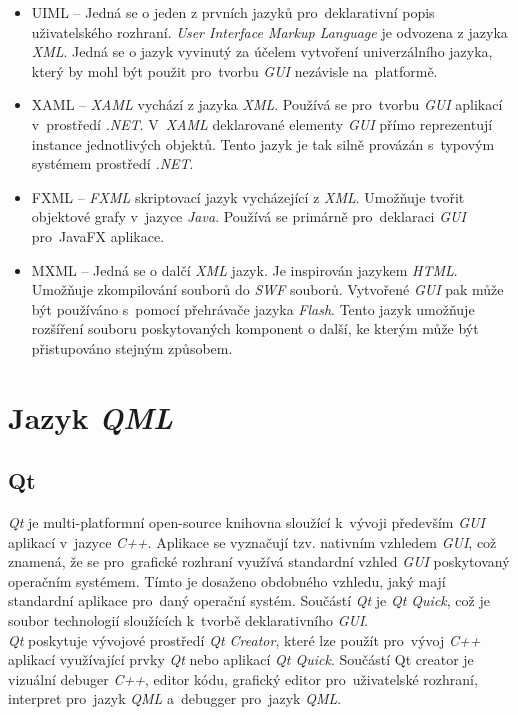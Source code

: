 \documentclass[11pt,twoside,a4paper]{book}
\begin{document}
\begin{itemize}
\item UIML – Jedná se o jeden z prvních jazyků pro~deklarativní popis uživatelského rozhraní. \textit{User Interface Markup Language} je odvozena z jazyka \textit{XML}. Jedná se o jazyk vyvinutý za účelem vytvoření univerzálního jazyka, který by mohl být použit pro~tvorbu \textit{GUI} nezávisle na~platformě. \cite{bib:UIML}
\item XAML – \textit{XAML} vychází z jazyka \textit{XML}. Používá se pro~tvorbu \textit{GUI} aplikací v~prostředí \textit{.NET}. V~\textit{XAML} deklarované elementy \textit{GUI} přímo reprezentují instance jednotlivých objektů. Tento jazyk je tak silně provázán s~typovým systémem prostředí \textit{.NET}. \cite{bib:XAML}
\item FXML – \textit{FXML} skriptovací jazyk vycházející z \textit{XML}. Umožňuje tvořit objektové grafy v~jazyce \textit{Java}. Používá se primárně pro~deklaraci \textit{GUI} pro~JavaFX aplikace.\cite{bib:FXML}
\item MXML – Jedná se o dalčí \textit{XML} jazyk. Je inspirován jazykem \textit{HTML}. Umožňuje zkompilování souborů do \textit{SWF} souborů. Vytvořené \textit{GUI} pak může být používáno s~pomocí přehrávače jazyka \textit{Flash}. Tento jazyk umožňuje rozšíření souboru poskytovaných komponent o další, ke kterým může být přistupováno stejným způsobem.\cite{bib:MXML}
\end{itemize}


\section{\label{SEC:QML}Jazyk \textit{QML}}
\subsection{Qt}
\textit{Qt} je multi-platformní open-source knihovna sloužící k~vývoji především \textit{GUI} aplikací v~jazyce \textit{C++}. Aplikace se vyznačují tzv. nativním vzhledem \textit{GUI}, což znamená, že se pro~grafické rozhraní využívá standardní vzhled \textit{GUI} poskytovaný operačním systémem. Tímto je dosaženo obdobného vzhledu, jaký mají standardní aplikace pro~daný operační systém. Součástí \textit{Qt} je \textit{Qt Quick}, což je soubor technologií sloužících k~tvorbě deklarativního \textit{GUI}.\\
\textit{Qt} poskytuje vývojové prostředí \textit{Qt Creator}, které lze použít pro~vývoj \textit{C++} aplikací využívající prvky \textit{Qt} nebo aplikací \textit{Qt Quick}. Součástí Qt creator je vizuální debuger \textit{C++}, editor kódu, grafický editor pro~uživatelské rozhraní, interpret pro~jazyk \textit{QML} a~debugger pro~jazyk \textit{QML}.
\end{document}
